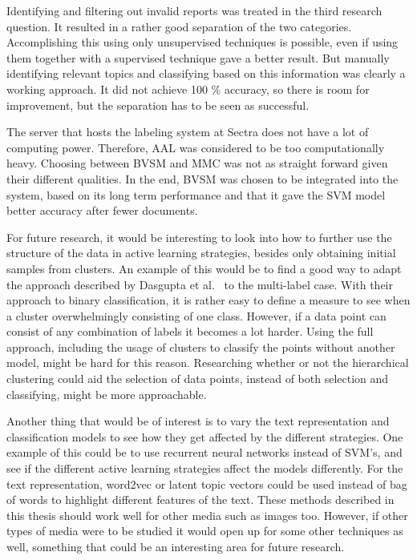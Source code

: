 Identifying and filtering out invalid reports was treated in the third research question.
It resulted in a rather good separation of the two categories.
Accomplishing this using only unsupervised techniques is possible, even if using them together with a supervised technique gave a better result.
But manually identifying relevant topics and classifying based on this information was clearly a working approach.
It did not achieve 100 \% accuracy, so there is room for improvement, but the separation has to be seen as successful.

The server that hosts the labeling system at Sectra does not have a lot of computing power.
Therefore, AAL was considered to be too computationally heavy.
Choosing between BVSM and MMC was not as straight forward given their different qualities.
In the end, BVSM was chosen to be integrated into the system, based on its long term performance and that it gave the SVM model better accuracy after fewer documents.

For future research, it would be interesting to look into how to further use the structure of the data in active learning strategies, besides only obtaining initial samples from clusters.
An example of this would be to find a good way to adapt the approach described by Dasgupta et al\@.~\cite{dasgupta2008hierarchical} to the multi-label case.
With their approach to binary classification, it is rather easy to define a measure to see when a cluster overwhelmingly consisting of one class.
However, if a data point can consist of any combination of labels it becomes a lot harder.
Using the full approach, including the usage of clusters to classify the points without another model, might be hard for this reason.
Researching whether or not the hierarchical clustering could aid the selection of data points, instead of both selection and classifying, might be more approachable.

Another thing that would be of interest is to vary the text representation and classification models to see how they get affected by the different strategies.
One example of this could be to use recurrent neural networks instead of SVM's, and see if the different active learning strategies affect the models differently.
For the text representation, word2vec or latent topic vectors could be used instead of bag of words to highlight different features of the text.
These methods described in this thesis should work well for other media such as images too. 
However, if other types of media were to be studied it would open up for some other techniques as well, something that could be an interesting area for future research.